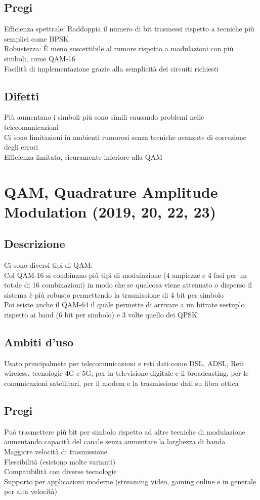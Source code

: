 \documentclass[10pt,oneside,a4paper]{article}
\begin{document}
\subsection{Pregi}
Efficienza spettrale: Raddoppia il numero di bit trasmessi rispetto a tecniche più semplici come BPSK\\
Robustezza: È meno suscettibile al rumore rispetto a modulazioni con più simboli, come QAM-16\\
Facilità di implementazione grazie alla semplicità dei circuiti richiesti\\
\subsection{Difetti}
Più aumentano i simboli più sono simili causando problemi nelle telecomunicazioni\\
Ci sono limitazioni in ambienti rumorosi senza tecniche avanzate di correzione degli errori\\
Efficienza limitata, sicuramente inferiore alla QAM
\section{QAM, Quadrature Amplitude Modulation (2019, 20, 22, 23)}
\subsection{Descrizione}
Ci sono diversi tipi di QAM:\\
Col QAM-16 si combinano più tipi di modulazione (4 ampiezze e 4 fasi per un totale di 16 combinazioni) in modo che se qualcosa viene attenuato o disperso il sistema è più robusto permettendo la trasmissione di 4 bit per simbolo\\
Poi esiste anche il QAM-64 il quale permette di arrivare a un bitrate sestuplo rispetto ai baud (6 bit per simbolo) e 3 volte quello dei QPSK
\subsection{Ambiti d'uso}
Usato principalmete per telecomunicazioni e reti dati come DSL, ADSL, Reti wireless, tecnologie 4G e 5G, per la televisione digitale e il broadcasting, per le comunicazioni satellitari, per il modem e la trasmissione dati su fibra ottica
\subsection{Pregi}
Può trasmettere più bit per simbolo rispetto ad altre tecniche di modulazione aumentando capacità del canale senza aumentare la larghezza di banda\\
Maggiore velocità di trasmissione\\
Flessibilità (esistono molte varianti)\\
Compatibilità con diverse tecnologie\\
Supporto per applicazioni moderne (streaming video, gaming online e in generale per alta velocità)
\end{document}
